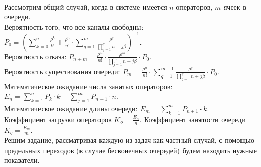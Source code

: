 \documentclass{article}
\begin{document}
\vspace{\baselineskip}
\\
Рассмотрим общий случай, когда в системе имеется \begin{math}n \end{math} операторов, \begin{math}m \end{math} ячеек в очереди. \\ Вероятность того, что все каналы свободны: \begin{math} P_0 = \left(\displaystyle\sum^n_{k=0} \displaystyle\frac{\rho^k}{ k!} + \displaystyle\frac{\rho^{n}}{n!} \cdot\sum^m_{q=1}\displaystyle\frac{\rho^q}{\displaystyle\prod\limits_{j = 1}^qn + j\beta} \right)^{-1}\end{math}. \\Вероятность отказа: \begin{math}P_{n+m} = \displaystyle\frac{\rho^{n}}{n!} \cdot\displaystyle\frac{\rho^m}{\displaystyle\prod\limits_{j = 1}^mn + j\beta} \cdot P_0\end{math}. \\
Вероятность существования очереди: \begin{math}P_m = \displaystyle\frac{\rho^{n}}{n!} \cdot\sum^{m-1}_{q=1}\displaystyle\frac{\rho^q}{\displaystyle\prod\limits_{j = 1}^qn + j\beta} \cdot P_0\end{math}.\\
Математическое ожидание числа занятых операторов: \begin{math}E_n = \displaystyle\sum_{k = 1}^n P_k \cdot k  + \displaystyle\sum_{j = 1}^m P_{n+1} \cdot n \end{math}. \\
Математическое ожидание длины очереди: \begin{math}E_m = \displaystyle\sum_{k = 1}^m P_{n+1} \cdot k \end{math}. \\
Коэффициент загрузки операторов \begin{math}K_o = \displaystyle\frac{E_n}{n}\end{math}.
Коэффициент занятости очереди \begin{math}K_q = \displaystyle\frac{E_m}{m}\end{math}.
\vspace{\baselineskip}
\\Решим задание, рассматривая каждую из задач как частный случай, с помощью предельных переходов (в случае бесконечных очередей) будем находить нужные показатели.
\vspace{\baselineskip}
\end{document}
